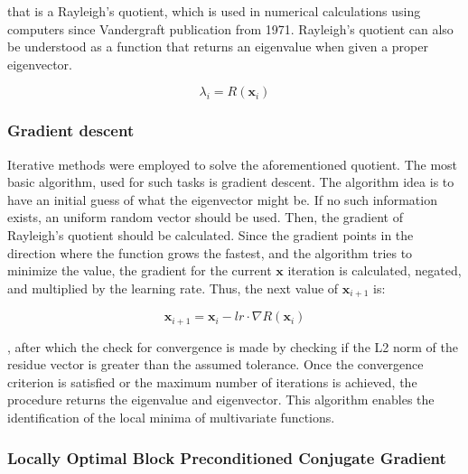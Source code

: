 \noindent that is a Rayleigh's quotient, which is used in numerical calculations using computers since Vandergraft \cite{vandergraft1971} publication from 1971. Rayleigh's quotient can also be understood as a function that returns an eigenvalue when given a proper eigenvector.

\begin{equation}
	\lambda_i = R(\textbf{x}_i)
\end{equation}

\noindent

\subsubsection{Gradient descent}

Iterative methods were employed to solve the aforementioned quotient. The most basic algorithm, used for such tasks is gradient descent.\cite{gradient_descent} The algorithm idea is to have an initial guess of what the eigenvector might be. If no such information exists, an uniform random vector should be used. Then, the gradient of Rayleigh's quotient should be calculated. Since the gradient points in the direction where the function grows the fastest, and the algorithm tries to minimize the value, the gradient for the current $\textbf{x}$ iteration is calculated, negated, and multiplied by the learning rate. Thus, the next value of $\textbf{x}_{i+1}$ is:

\begin{equation}
	\textbf{x}_{i+1} = \textbf{x}_{i} - lr \cdot \nabla R(\textbf{x}_{i})
\end{equation}

\noindent, after which the check for convergence is made by checking if the L2 norm of the residue vector is greater than the assumed tolerance. Once the convergence criterion is satisfied or the maximum number of iterations is achieved, the procedure returns the eigenvalue and eigenvector. This algorithm enables the identification of the local minima of multivariate functions.

\subsubsection{Locally Optimal Block Preconditioned Conjugate Gradient}

